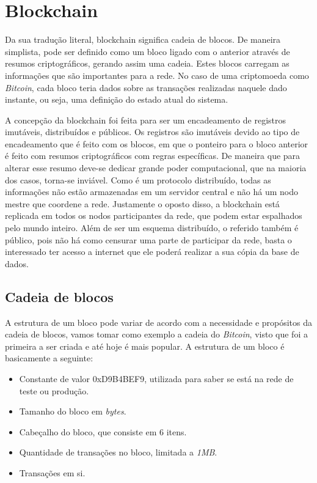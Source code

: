 \documentclass{ufsctex/ufsctex}
\begin{document}
\section{Blockchain}

Da sua tradução literal, blockchain significa cadeia de blocos. De maneira
simplista, pode ser definido como um bloco ligado com o anterior através de
resumos criptográficos, gerando assim uma cadeia. Estes blocos carregam as
informações que são importantes para a rede. No caso de uma criptomoeda como
\textit{Bitcoin}, cada bloco teria dados sobre as transações realizadas naquele
dado instante, ou seja, uma definição do estado atual do sistema.

A concepção da blockchain foi feita para ser um encadeamento de registros
imutáveis, distribuídos e públicos. Os registros são imutáveis devido ao tipo
de encadeamento que é feito com os blocos, em que o ponteiro para o bloco
anterior é feito com resumos criptográficos com regras específicas. De maneira
que para alterar esse resumo deve-se dedicar grande poder computacional, que na
maioria dos casos, torna-se inviável. Como é um protocolo distribuído, todas as
informações não estão armazenadas em um servidor central e não há um nodo
mestre que coordene a rede. Justamente o oposto disso, a blockchain está
replicada em todos os nodos participantes da rede, que podem estar espalhados
pelo mundo inteiro. Além de ser um esquema distribuído, o referido também é
público, pois não há como censurar uma parte de participar da rede, basta o
interessado ter acesso a internet que ele poderá realizar a sua cópia da base
de dados. \cite{blockchain}

\subsection{Cadeia de blocos} A estrutura de um bloco pode variar de acordo com
a necessidade e propósitos da cadeia de blocos, vamos tomar como exemplo a
cadeia do \textit{Bitcoin}, visto que foi a primeira a ser criada e até hoje é
mais popular. A estrutura de um bloco é basicamente a seguinte:

\begin{itemize}
	\item Constante de valor 0xD9B4BEF9, utilizada para saber se está na rede
		de teste ou produção.
	\item Tamanho do bloco em \textit{bytes}.
	\item Cabeçalho do bloco, que consiste em 6 itens.
	\item Quantidade de transações no bloco, limitada a \textit{1MB}.
	\item Transações em si.
\end{itemize}
\end{document}
